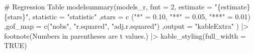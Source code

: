 \documentclass[
  letterpaper,
  DIV=11,
  numbers=noendperiod]{scrreprt}
\newenvironment{Shaded}{\begin{snugshade}}{\end{snugshade}}
\newcommand{\AttributeTok}[1]{\textcolor[rgb]{0.40,0.45,0.13}{#1}}
\newcommand{\CommentTok}[1]{\textcolor[rgb]{0.37,0.37,0.37}{#1}}
\newcommand{\ConstantTok}[1]{\textcolor[rgb]{0.56,0.35,0.01}{#1}}
\newcommand{\DecValTok}[1]{\textcolor[rgb]{0.68,0.00,0.00}{#1}}
\newcommand{\FloatTok}[1]{\textcolor[rgb]{0.68,0.00,0.00}{#1}}
\newcommand{\FunctionTok}[1]{\textcolor[rgb]{0.28,0.35,0.67}{#1}}
\newcommand{\NormalTok}[1]{\textcolor[rgb]{0.00,0.23,0.31}{#1}}
\newcommand{\OtherTok}[1]{\textcolor[rgb]{0.00,0.23,0.31}{#1}}
\newcommand{\SpecialCharTok}[1]{\textcolor[rgb]{0.37,0.37,0.37}{#1}}
\newcommand{\StringTok}[1]{\textcolor[rgb]{0.13,0.47,0.30}{#1}}
\begin{document}
\begin{Shaded}
\begin{Highlighting}[]
\CommentTok{\# Regression Table}
\FunctionTok{modelsummary}\NormalTok{(models\_r, }\AttributeTok{fmt =} \DecValTok{2}\NormalTok{,}
              \AttributeTok{estimate =} \StringTok{"\{estimate\}\{stars\}"}\NormalTok{,}
              \AttributeTok{statistic =} \StringTok{"statistic"}
\NormalTok{              ,}\AttributeTok{stars =} \FunctionTok{c}\NormalTok{ (}\StringTok{"*"} \OtherTok{=} \FloatTok{0.10}\NormalTok{, }\StringTok{"**"} \OtherTok{=} \FloatTok{0.05}\NormalTok{, }\StringTok{"***"} \OtherTok{=}  \FloatTok{0.01}\NormalTok{)}
\NormalTok{              ,}\AttributeTok{gof\_map =} \FunctionTok{c}\NormalTok{(}\StringTok{"nobs"}\NormalTok{, }\StringTok{"r.squared"}\NormalTok{, }\StringTok{"adj.r.squared"}\NormalTok{)}
\NormalTok{              ,}\AttributeTok{output =} \StringTok{"kableExtra"}
\NormalTok{            ) }\SpecialCharTok{|\textgreater{}} 
  \FunctionTok{footnote}\NormalTok{(}\StringTok{\textquotesingle{}Numbers in parentheses are t values.\textquotesingle{}}\NormalTok{) }\SpecialCharTok{|\textgreater{}} 
  \FunctionTok{kable\_styling}\NormalTok{(}\AttributeTok{full\_width =} \ConstantTok{TRUE}\NormalTok{)}
\end{Highlighting}
\end{Shaded}
\end{document}
